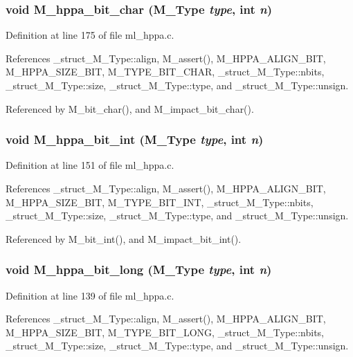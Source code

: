 \subsubsection{\setlength{\rightskip}{0pt plus 5cm}void M\_\-hppa\_\-bit\_\-char (\bf{M\_\-Type} {\em type}, int {\em n})}\label{ml__hppa_8c_72487e5368b3b505364af89d6458c014}




Definition at line 175 of file ml\_\-hppa.c.

References \_\-struct\_\-M\_\-Type::align, M\_\-assert(), M\_\-HPPA\_\-ALIGN\_\-BIT, M\_\-HPPA\_\-SIZE\_\-BIT, M\_\-TYPE\_\-BIT\_\-CHAR, \_\-struct\_\-M\_\-Type::nbits, \_\-struct\_\-M\_\-Type::size, \_\-struct\_\-M\_\-Type::type, and \_\-struct\_\-M\_\-Type::unsign.

Referenced by M\_\-bit\_\-char(), and M\_\-impact\_\-bit\_\-char().
\subsubsection{\setlength{\rightskip}{0pt plus 5cm}void M\_\-hppa\_\-bit\_\-int (\bf{M\_\-Type} {\em type}, int {\em n})}\label{ml__hppa_8c_db47df63a551328cf21f32439d2fb307}




Definition at line 151 of file ml\_\-hppa.c.

References \_\-struct\_\-M\_\-Type::align, M\_\-assert(), M\_\-HPPA\_\-ALIGN\_\-BIT, M\_\-HPPA\_\-SIZE\_\-BIT, M\_\-TYPE\_\-BIT\_\-INT, \_\-struct\_\-M\_\-Type::nbits, \_\-struct\_\-M\_\-Type::size, \_\-struct\_\-M\_\-Type::type, and \_\-struct\_\-M\_\-Type::unsign.

Referenced by M\_\-bit\_\-int(), and M\_\-impact\_\-bit\_\-int().
\subsubsection{\setlength{\rightskip}{0pt plus 5cm}void M\_\-hppa\_\-bit\_\-long (\bf{M\_\-Type} {\em type}, int {\em n})}\label{ml__hppa_8c_db6cca7ff9ffeb7557ce4882e428f948}




Definition at line 139 of file ml\_\-hppa.c.

References \_\-struct\_\-M\_\-Type::align, M\_\-assert(), M\_\-HPPA\_\-ALIGN\_\-BIT, M\_\-HPPA\_\-SIZE\_\-BIT, M\_\-TYPE\_\-BIT\_\-LONG, \_\-struct\_\-M\_\-Type::nbits, \_\-struct\_\-M\_\-Type::size, \_\-struct\_\-M\_\-Type::type, and \_\-struct\_\-M\_\-Type::unsign.

